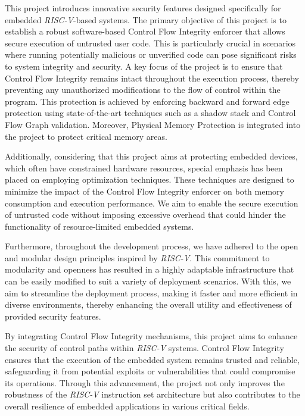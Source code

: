 This project introduces innovative security features designed specifically for
embedded \textit{RISC-V}-based systems. The primary objective of this project is
to establish a robust software-based Control Flow Integrity enforcer that allows
secure execution of untrusted user code. This is particularly crucial in scenarios
where running potentially malicious or unverified code can pose significant risks
to system integrity and security. A key focus of the project is to ensure that
Control Flow Integrity remains intact throughout the execution process, thereby preventing
any unauthorized modifications to the flow of control within the program. This
protection is achieved by enforcing backward and forward edge protection using
state-of-the-art techniques such as a shadow stack and Control Flow Graph
validation. Moreover, Physical Memory Protection is integrated into the project
to protect critical memory areas.

Additionally, considering that this project aims at protecting embedded devices,
which often have constrained hardware resources, special emphasis has been placed
on employing optimization techniques. These techniques are designed to minimize
the impact of the Control Flow Integrity enforcer on both memory consumption and
execution performance. We aim to enable the secure execution of untrusted code without
imposing excessive overhead that could hinder the functionality of resource-limited
embedded systems.

Furthermore, throughout the development process, we have adhered to the open and
modular design principles inspired by \textit{RISC-V}. This commitment to modularity
and openness has resulted in a highly adaptable infrastructure that can be easily
modified to suit a variety of deployment scenarios. With this, we aim to streamline
the deployment process, making it faster and more efficient in diverse
environments, thereby enhancing the overall utility and effectiveness of provided
security features.

By integrating Control Flow Integrity mechanisms, this project aims to enhance
the security of control paths within \textit{RISC-V} systems. Control Flow
Integrity ensures that the execution of the embedded system remains trusted and
reliable, safeguarding it from potential exploits or vulnerabilities that could compromise
its operations. Through this advancement, the project not only improves the robustness
of the \textit{RISC-V} instruction set architecture but also contributes to the
overall resilience of embedded applications in various critical fields.


